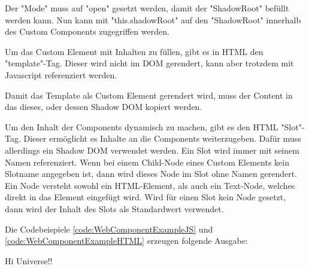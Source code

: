 
Der "Mode" muss auf "{\ttfamily open}" gesetzt werden, damit der "ShadowRoot" befüllt werden kann. Nun kann mit "{\ttfamily this.shadowRoot}" auf den "ShadowRoot" innerhalb des Custom Components zugegriffen werden.
\cite{MDNShadowRoot}

\pagebreak
{}

Um das Custom Element mit Inhalten zu füllen, gibt es in HTML den "template"-Tag. Dieser wird nicht im DOM gerendert, kann aber trotzdem mit Javascript referenziert werden. \cite{MDNtemplate}


Damit das Template als Custom Element gerendert wird, muss der Content in das dieses, oder dessen Shadow DOM kopiert werden.



Um den Inhalt der Components dynamisch zu machen, gibt es den HTML "Slot"-Tag. 
Dieser ermöglicht es Inhalte an die Components weiterzugeben. 
Dafür muss allerdings ein Shadow DOM verwendet werden. 
Ein Slot wird immer mit seinem Namen referenziert. 
Wenn bei einem Child-Node eines Custom Elements kein Slotname angegeben ist, dann wird dieses Node im Slot ohne Namen gerendert. 
Ein Node versteht sowohl ein HTML-Element, als auch ein Text-Node, welches direkt in das Element eingefügt wird. 
Wird für einen Slot kein Node gesetzt, dann wird der Inhalt des Slots als Standardwert verwendet. 
\cite{MDNSlots}

\pagebreak
{}




Die Codebeispiele \ref{code:WebComponentExampleJS} und \ref{code:WebComponentExampleHTML} erzeugen folgende Ausgabe:

{\ttfamily Hi Universe!!}